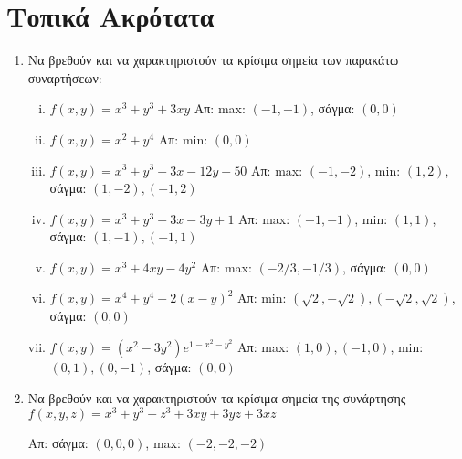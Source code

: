 


\pagestyle{askhseis}

\renewcommand{\vec}{\mathbf}



\begin{center}
  \minibox{\large \bfseries \textcolor{Col1}{Ασκήσεις στα Ακρότατα}}
\end{center}

\vspace{\baselineskip}

\section*{Τοπικά Ακρότατα}

\begin{enumerate}
  \item Να βρεθούν και να χαρακτηριστούν τα κρίσιμα σημεία  των παρακάτω συναρτήσεων:
    \begin{enumerate}[i)]
      \item $ f(x,y) = x^{3} + y^{3} + 3xy $ 
        \hfill Απ: max: $(-1,-1)  $, σάγμα: $ (0,0) $
      \item $ f(x,y) = x^{2}+y^{4} $ 
        \hfill Απ: min: $ (0,0) $ 
      \item $ f(x,y) = x^{3} + y^{3} - 3x -12y + 50 $ 
        \hfill Απ: max: $ (-1,-2)$, min: $ (1,2) $, 
        σάγμα: $ (1,-2), (-1,2) $
      \item $ f(x,y) = x^{3} + y^{3} -3x -3y + 1 $ 
        \hfill Απ: max: $(-1,-1)  $, min: $ (1,1) $,
        σάγμα: $ (1,-1), (-1,1) $
      \item $ f(x,y) = x^{3} + 4xy -4y^{2} $ 
        \hfill Απ: max: $ (-2/3, -1/3)  $, σάγμα: $ (0,0) $
      \item $ f(x,y) = x^{4} + y^{4} -2(x-y)^{2}$  
        \hfill Απ: min: $ (\sqrt{2} , -\sqrt{2}), (-\sqrt{2} , \sqrt{2}) $, 
        σάγμα: $ (0,0) $
      \item $ f(x,y) = (x^{2}-3y^{2})e^{1-x^{2}-y^{2}} $ 
        \hfill Απ: max: $ (1,0), (-1,0) $, min: $ (0,1), (0,-1) $, 
        σάγμα: $ (0,0) $
    \end{enumerate}

  \item Να βρεθούν και να χαρακτηριστούν τα κρίσιμα σημεία της συνάρτησης 
    $ f(x,y,z) = x^{3} + y^{3}+z^{3} + 3xy +3yz + 3xz $

    \hfill Απ: σάγμα: $(0,0,0)$, max: $(-2,-2,-2)$  


\end{enumerate}
